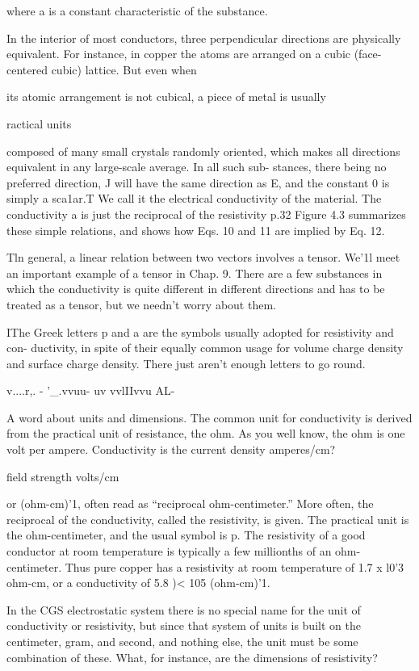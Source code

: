 where a is a constant characteristic of the substance.

In the interior of most conductors, three perpendicular directions
are physically equivalent. For instance, in copper the atoms are
arranged on a cubic (face-centered cubic) lattice. But even when

its atomic arrangement is not cubical, a piece of metal is usually

ractical units

composed of many small crystals randomly oriented, which makes
all directions equivalent in any large-scale average. In all such sub-
stances, there being no preferred direction, J will have the same
direction as E, and the constant 0 is simply a sca1ar.T We call it the
electrical conductivity of the material. The conductivity a is just the
reciprocal of the resistivity p.32 Figure 4.3 summarizes these simple
relations, and shows how Eqs. 10 and 11 are implied by Eq. 12.

Tln general, a linear relation between two vectors involves a tensor. We'1l meet an
important example of a tensor in Chap. 9. There are a few substances in which the
conductivity is quite different in different directions and has to be treated as a tensor,
but we needn't worry about them.

IThe Greek letters p and a are the symbols usually adopted for resistivity and con-
ductivity, in spite of their equally common usage for volume charge density and surface
charge density. There just aren't enough letters to go round.

v....r,. - '_.vvuu- uv \/vvlI\/Ivvu AL-

A word about units and dimensions. The common unit for conductivity
is derived from the practical unit of resistance, the ohm. As
you well know, the ohm is one volt per ampere. Conductivity is the
current density amperes/cm?

field strength volts/cm

or (ohm-cm)'1, often read as ``reciprocal ohm-centimeter.'' More
often, the reciprocal of the conductivity, called the resistivity, is given.
The practical unit is the ohm-centimeter, and the usual symbol is p.
The resistivity of a good conductor at room temperature is typically
a few millionths of an ohm-centimeter. Thus pure copper has a
resistivity at room temperature of 1.7 x l0'3 ohm-cm, or a conductivity
of 5.8 )< 105 (ohm-cm)'1.

In the CGS electrostatic system there is no special name for the
unit of conductivity or resistivity, but since that system of units is
built on the centimeter, gram, and second, and nothing else, the unit
must be some combination of these. What, for instance, are the
dimensions of resistivity?

